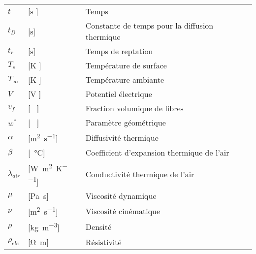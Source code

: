 \begin{longtable}{l p{2.5cm} p{4in}}
	$t$              & [\si{\second} ]                                     & Temps                                                        \\
	$t_D$            & [\si{\second}]                                      & Constante de temps pour la diffusion thermique               \\
	$t_r$            & [\si{\second}]                                      & Temps de reptation                                           \\
	$T_s$            & [\si{\kelvin} ]                                     & Température de surface                                       \\
	$T_{\infty}$     & [\si{\kelvin} ]                                     & Température ambiante                                         \\
	$V$              & [\si{\volt} ]                                       & Potentiel électrique                                         \\
	$v_f$            & [ \ ]                                               & Fraction volumique de fibres                                 \\
	$w^*$            & [ \ ]                                               & Paramètre géométrique                                         \\
	$\alpha$         & [\si{\square\metre\per\second}]                     & Diffusivité thermique                                        \\
	$\beta$          & [\si{\per\celsius}]                                 & Coefficient d'expansion thermique de l'air                   \\
	$\lambda_{air}$  & [\si{\watt\per\square\metre\per\kelvin}]            & Conductivité thermique de l'air                              \\
	$\mu$            & [\si{\pascal\second}]                               & Viscosité dynamique                                          \\
	$\nu$            & [\si{\square\metre\per\second}]                     & Viscosité cinématique                                        \\
	$\rho$           & [\si{\kilogram\per\cubic\metre}]                    & Densité                                                      \\
	$\rho_{ele}$     & [\si{\ohm\metre}]                                   & Résistivité                                                  \\

\end{longtable}
